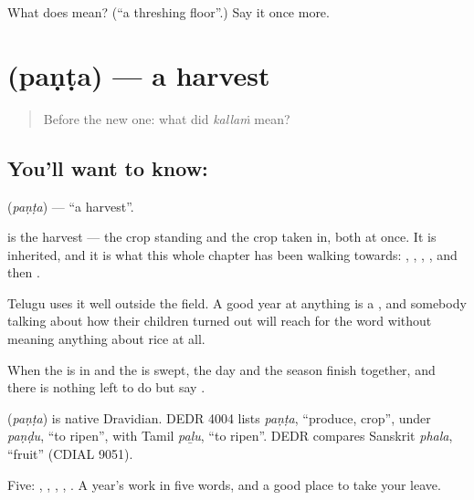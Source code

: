 \begin{tcolorbox}[breakable,colback=teal!4,colframe=teal!35!black,title={Before you move on}]
What does  mean? (\textquotedblleft{}a threshing floor\textquotedblright{}.) Say it once more.
\end{tcolorbox}
\section[\texorpdfstring{\te{పంట} (paṇṭa)}{పంట (paṇṭa)}]{ (paṇṭa) — a harvest}

\label{lesson:TE-C66-harvest}



\begin{quote}
Before the new one: what did \emph{kallaṁ} mean?
\end{quote}

\subsection*{You'll want to know: }
\textbf{} (\emph{paṇṭa}) — \textquotedblleft{}a harvest\textquotedblright{}.

 is the harvest — the crop standing and the crop taken in, both at once. It is inherited, and it is what this whole chapter has been walking towards: , , , , and then .

Telugu uses it well outside the field. A good year at anything is a  , and somebody talking about how their children turned out will reach for the word without meaning anything about rice at all.

When the  is in and the  is swept, the day and the season finish together, and there is nothing left to do but say .

\begin{cousinweb}
\textbf{} (\emph{paṇṭa}) is native Dravidian. DEDR 4004 lists \emph{paṇṭa}, \textquotedblleft{}produce, crop\textquotedblright{}, under \emph{paṇḍu}, \textquotedblleft{}to ripen\textquotedblright{}, with Tamil \emph{paḻu}, \textquotedblleft{}to ripen\textquotedblright{}. DEDR compares Sanskrit \emph{phala}, \textquotedblleft{}fruit\textquotedblright{} (CDIAL 9051).
\end{cousinweb}

\begin{grammarlens}[title={What you've built}]
Five: , , , , . A year's work in five words, and a good place to take your leave.
\end{grammarlens}

